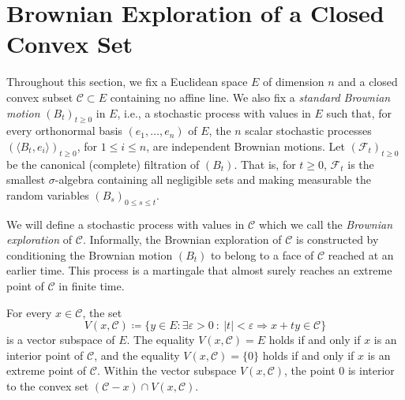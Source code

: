 \documentclass[12pt]{amsart}
\newcommand{\e}{\varepsilon}
\newcommand{\scalar}[2]{\langle #1 , #2\rangle}
\renewcommand{\leq}{\leqslant}
\renewcommand{\geq}{\geqslant}
\theoremstyle{plain}
\theoremstyle{remark}
\begin{document}
 
\section{Brownian Exploration of a Closed Convex Set} \label{sec:exploration}
 
Throughout this section, we fix a Euclidean space $E$ of dimension $n$ and a closed convex subset $\mathscr{C} \subset E$ containing no affine line. We also fix a \emph{standard Brownian motion} $(B_t)_{t \geq 0}$ in $E$, i.e., a stochastic process with values in $E$ such that, for every orthonormal basis $(e_1,\dots,e_n)$ of $E$, the $n$ scalar stochastic processes $(\scalar{B_t}{e_i})_{t \geq 0}$, for $1 \leq i \leq n$, are independent Brownian motions. Let $(\mathcal{F}_t)_{t \geq 0}$ be the canonical (complete) filtration of $(B_t)$. That is, for $t \geq 0$, $\mathcal{F}_t$ is the smallest $\sigma$-algebra containing all negligible sets and making measurable the random variables $(B_s)_{0 \leq s \leq t}$.
 
\medskip
 
We will define a stochastic process with values in $\mathscr{C}$ which we call the \emph{Brownian exploration} of $\mathscr{C}$. Informally, the Brownian exploration of $\mathscr{C}$ is constructed by conditioning the Brownian motion $(B_t)$ to belong to a face of $\mathscr{C}$ reached at an earlier time. This process is a martingale that almost surely reaches an extreme point of $\mathscr{C}$ in finite time.
 
\medskip
 
For every $x \in \mathscr{C}$, the set
\begin{equation}
\label{eq:defVxC}
V(x,\mathscr{C}) \coloneqq \{ y \in E : \exists \e > 0 \ : \ |t| < \e \Longrightarrow x+ty \in \mathscr{C} \} \end{equation}
is a vector subspace of $E$. The equality $V(x,\mathscr{C})=E$ holds if and only if $x$ is an interior point of $\mathscr{C}$, and the equality $V(x,\mathscr{C})=\{0\}$ holds if and only if $x$ is an extreme point of $\mathscr{C}$. Within the vector subspace $V(x,\mathscr{C})$, the point $0$ is interior to the convex set $(\mathscr{C}-x) \cap V(x,\mathscr{C})$.
 
\medskip
 
\end{document}
